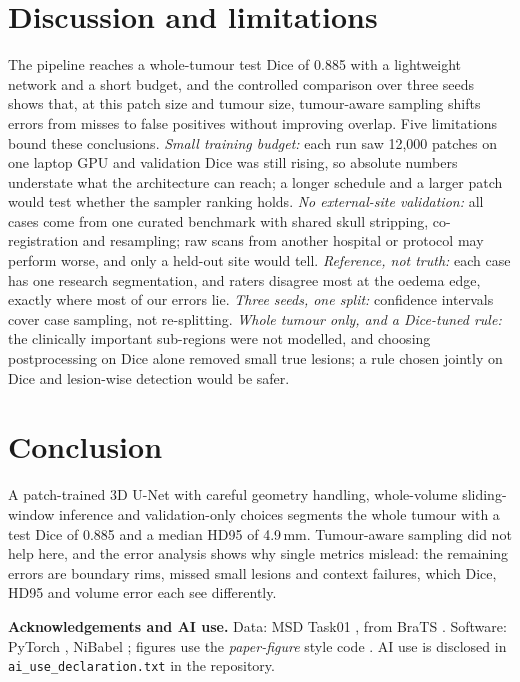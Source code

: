 \documentclass[11pt,a4paper]{article}
\begin{document}
\section{Discussion and limitations}
The pipeline reaches a whole-tumour test Dice of 0.885 with a lightweight network and a short budget, and the
controlled comparison over three seeds shows that, at this patch size and tumour size, tumour-aware sampling shifts
errors from misses to false positives without improving overlap. Five limitations bound these conclusions.
\emph{Small training budget:} each run saw 12,000 patches on one laptop GPU and validation Dice was still rising, so
absolute numbers understate what the architecture can reach; a longer schedule and a larger patch would test whether
the sampler ranking holds. \emph{No external-site validation:} all cases come from one curated benchmark with shared
skull stripping, co-registration and resampling; raw scans from another hospital or protocol may perform worse, and
only a held-out site would tell. \emph{Reference, not truth:} each case has one research segmentation, and raters
disagree most at the oedema edge, exactly where most of our errors lie. \emph{Three seeds, one split:} confidence
intervals cover case sampling, not re-splitting. \emph{Whole tumour only, and a Dice-tuned rule:} the clinically
important sub-regions were not modelled, and choosing postprocessing on Dice alone removed small true lesions; a rule
chosen jointly on Dice and lesion-wise detection would be safer.

\section{Conclusion}
A patch-trained 3D U-Net with careful geometry handling, whole-volume sliding-window inference and validation-only
choices segments the whole tumour with a test Dice of 0.885 and a median HD95 of 4.9\,mm. Tumour-aware sampling did not
help here, and the error analysis shows why single metrics mislead: the remaining errors are boundary rims, missed small
lesions and context failures, which Dice, HD95 and volume error each see differently.

\medskip\noindent\textbf{Acknowledgements and AI use.} Data: MSD Task01 \cite{simpson2019,antonelli2022}, from BraTS \cite{menze2015,bakas2017}. Software: PyTorch \cite{paszke2019}, NiBabel \cite{nibabel}; figures use the \emph{paper-figure} style code \cite{paperfigure}. AI use is disclosed in \texttt{ai\_use\_declaration.txt} in the repository.
\end{document}
